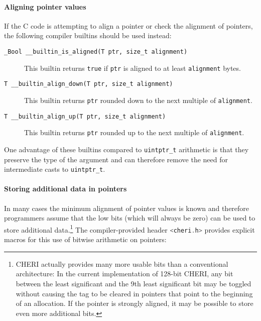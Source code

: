 \documentclass[11pt]{article}
\newcommand{\ccode}[1]{\lstinline[language={C},basicstyle=\small\ttfamily]{#1}}
\newcommand{\uintptr}{\texttt{uintptr\_t}\xspace}
\newcommand{\note}[2]{{\color{blue}[ Note: #1 - #2]}}
\renewcommand{\note}[2]{}
\newcommand{\rwnote}[1]{\note{#1}{Robert W.}}
\begin{document}
\paragraph{Aligning pointer values}
If the C code is attempting to align a pointer or check the alignment of pointers,
the following compiler builtins should be used instead:
\begin{description}
\item[\texttt{\_Bool \_\_builtin\_is\_aligned(T ptr, size\_t alignment)}]
  This builtin returns \texttt{true} if \texttt{ptr} is aligned to at least \texttt{alignment} bytes.
\item[\texttt{T \_\_builtin\_align\_down(T ptr, size\_t alignment)}]
  This builtin returns \texttt{ptr} rounded down to the next multiple of \texttt{alignment}.
\item[\texttt{T \_\_builtin\_align\_up(T ptr, size\_t alignment)}]
  This builtin returns \texttt{ptr} rounded up to the next multiple of \texttt{alignment}.
\end{description}

\rwnote{It would be nice if we had, and could document here, cheri\_ versions
  of these macros.}

One advantage of these builtins compared to \uintptr arithmetic is that they preserve the
type of the argument and can therefore remove the need for intermediate casts to \uintptr.

\paragraph{Storing additional data in pointers}
\label{sec:low-pointer-bits}
In many cases the minimum alignment of pointer values is known and therefore
programmers assume that the low bits (which will always be zero) can be
used to store additional data.\footnote{%
CHERI actually provides many more usable bits than a conventional architecture:
In the current implementation of 128-bit CHERI, any bit between the least
significant and the 9th least significant bit may be toggled without causing
the tag to be cleared in pointers that point to the beginning of an allocation.
If the pointer is strongly aligned, it may be possible to store even more additional bits.}
The compiler-provided header \ccode{<cheri.h>} provides explicit macros for this
use of bitwise arithmetic on pointers:
\end{document}
